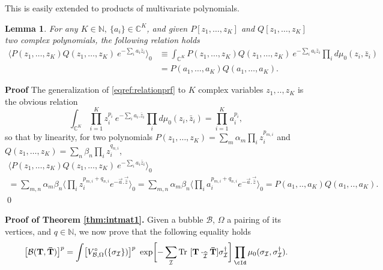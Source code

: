 \documentclass[aps,prd,10pt,notitlepage,nofootinbib,superscriptaddress,showkeys,showpacs]{revtex4-1}
\newtheorem{lemma}{Lemma}
\begin{document}
This is easily extended to products of multivariate polynomials.
\begin{lemma} 
\label{polprod}
For any $K\in{\mathbb{N}},\ \{a_i\}\in{\mathbb{C}}^K$, and given  $P[z_1,\dotsc,z_K]$ and $Q[z_1,\dotsc,z_K]$ two complex polynomials, the following relation holds
\begin{equation}
\begin{aligned}
\langle P(z_1,\dotsc,z_K) Q(z_1,\dotsc,z_K)\ e^{- \sum_i a_i\bar z_i } \rangle_0 &\equiv \int_{\mathbb C ^K} P(z_1,\dotsc,z_K) Q(z_1,\dotsc,z_K)\ e^{- \sum_i a_i\bar z_i }\prod_id\mu_{0}(z_i, \bar z_i)\\
&= P(a_1,\dotsc, a_K) Q(a_1,\dotsc, a_K).
\end{aligned}
\end{equation}	
\end{lemma}

{{\noindent \bf Proof\; \; }} The generalization of \eqref{eqref:relationprf} to $K$ complex variables $z_1,..,z_K$ is the obvious relation
\begin{equation}
\label{eqref:monomial}
\int_{\mathbb C ^K} \prod_{i=1}^K z_i^{p_i} \ e^{- \sum_i a_i.\bar z_i }\prod_id\mu_{0}(z_i, \bar z_i)=\prod_{i=1}^Ka_i^{p_i},
\end{equation}
so that by linearity, for two polynomials $P(z_1,\dotsc,z_K)=\sum_{m}\alpha_m\prod_i z_i^{p_{m,i}}$ and $Q(z_1,\dotsc,z_K)=\sum_{n}\beta_n\prod_i z_i^{q_{n,i}}$, 
\begin{multline}
\langle P(z_1,\dotsc,z_K) Q(z_1,\dotsc,z_K)\ e^{- \sum_i a_i\bar z_i } \rangle_0\\
=\sum_{m,n}\alpha_m\beta_n\langle \prod_i z_i^{p_{m,i}+q_{n,i}}e^{-\vec{a}.\vec{\bar z}}\rangle_0=\sum_{m,n}\alpha_m\beta_n\langle \prod_i a_i^{p_{m,i}+q_{n,i}}e^{-\vec{a}.\vec{\bar z}}\rangle_0=P(a_1,..,a_K)Q(a_1,..,a_K)\nonumber . 
\end{multline}
\qed

{\bf Proof of Theorem \ref{thm:intmat1}.} Given a bubble ${\mathcal{B}}$, $\Omega$ a pairing of its vertices, and $q\in{\mathbb{N}}$, we now prove that the following equality holds
\begin{equation}
\label{bubblepower}
\bigl[ {\mathcal{B}}({\bf T},{\bf \bar T}) \bigr]^p
= 
\int  \bigl[V_{{\mathcal{B}},\Omega}^{\circ}(\{\sigma_{\mathcal{I}}\})\bigr]^p\ \exp\biggl[ - \sum_{\mathcal{I}}  \operatorname{Tr}\ [{\bf T}\cdot_{\widehat{\mathcal{I}}}{\bf \bar T}]\sigma_{\mathcal{I}}^\dagger  \biggr]
\prod_\cId\mu_{0}(\sigma_{\mathcal{I}},{\bf \sigma_{\mathcal{I}}^\dagger}).
\end{equation}
\end{document}

